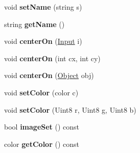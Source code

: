 \begin{DoxyCompactItemize}
\item 
void {\bfseries set\+Name} (string s)\hypertarget{classObject_a710f0d5a657ae488408e1191bfccbddb}{}\label{classObject_a710f0d5a657ae488408e1191bfccbddb}

\item 
string {\bfseries get\+Name} ()\hypertarget{classObject_ac63fc97e60a9b5772afd9adefc337928}{}\label{classObject_ac63fc97e60a9b5772afd9adefc337928}

\item 
void {\bfseries center\+On} (\hyperlink{classInput}{Input} i)\hypertarget{classObject_a3f0dd556a0bc28cdc3ac99f8dbc5e9a9}{}\label{classObject_a3f0dd556a0bc28cdc3ac99f8dbc5e9a9}

\item 
void {\bfseries center\+On} (int cx, int cy)\hypertarget{classObject_a32c6b207bc3f04afda88d1b483b5cc93}{}\label{classObject_a32c6b207bc3f04afda88d1b483b5cc93}

\item 
void {\bfseries center\+On} (\hyperlink{classObject}{Object} obj)\hypertarget{classObject_af04a43818df93d6cbd87cfba97f56fb7}{}\label{classObject_af04a43818df93d6cbd87cfba97f56fb7}

\item 
void {\bfseries set\+Color} (color c)\hypertarget{classObject_a63ba630f4c0329b53bf92418fda14c28}{}\label{classObject_a63ba630f4c0329b53bf92418fda14c28}

\item 
void {\bfseries set\+Color} (Uint8 r, Uint8 g, Uint8 b)\hypertarget{classObject_a3edcc3118a41df3a46a096b23823f37e}{}\label{classObject_a3edcc3118a41df3a46a096b23823f37e}

\item 
bool {\bfseries image\+Set} () const \hypertarget{classObject_a5adfc058772a1306d7edbd4e68e77533}{}\label{classObject_a5adfc058772a1306d7edbd4e68e77533}

\item 
color {\bfseries get\+Color} () const \hypertarget{classObject_ad52c4bd668636e18483c1a47b21cd695}{}\label{classObject_ad52c4bd668636e18483c1a47b21cd695}

\end{DoxyCompactItemize}
